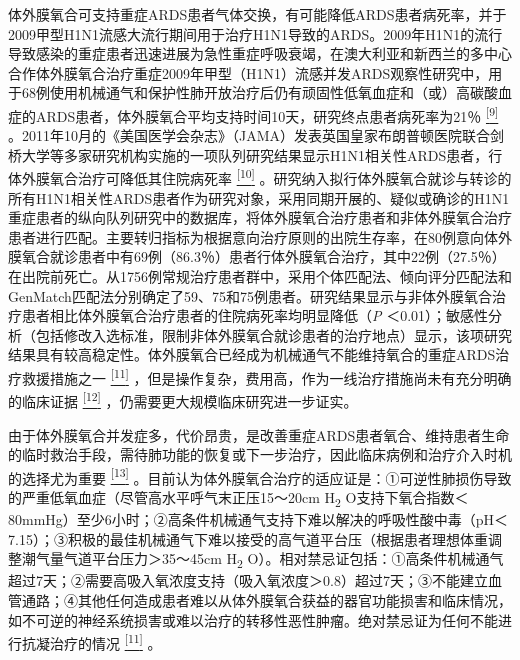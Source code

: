 体外膜氧合可支持重症ARDS患者气体交换，有可能降低ARDS患者病死率，并于2009甲型H1N1流感大流行期间用于治疗H1N1导致的ARDS。2009年H1N1的流行导致感染的重症患者迅速进展为急性重症呼吸衰竭，在澳大利亚和新西兰的多中心合作体外膜氧合治疗重症2009年甲型（H1N1）流感并发ARDS观察性研究中，用于68例使用机械通气和保护性肺开放治疗后仍有顽固性低氧血症和（或）高碳酸血症的ARDS患者，体外膜氧合平均支持时间10天，研究终点患者病死率为21％
\protect\hyperlink{text00030.htmlux5cux23ch9-29}{\textsuperscript{{[}9{]}}}
。2011年10月的《美国医学会杂志》（JAMA）发表英国皇家布朗普顿医院联合剑桥大学等多家研究机构实施的一项队列研究结果显示H1N1相关性ARDS患者，行体外膜氧合治疗可降低其住院病死率
\protect\hyperlink{text00030.htmlux5cux23ch10-29}{\textsuperscript{{[}10{]}}}
。研究纳入拟行体外膜氧合就诊与转诊的所有H1N1相关性ARDS患者作为研究对象，采用同期开展的、疑似或确诊的H1N1重症患者的纵向队列研究中的数据库，将体外膜氧合治疗患者和非体外膜氧合治疗患者进行匹配。主要转归指标为根据意向治疗原则的出院生存率，在80例意向体外膜氧合就诊患者中有69例（86.3％）患者行体外膜氧合治疗，其中22例（27.5％）在出院前死亡。从1756例常规治疗患者群中，采用个体匹配法、倾向评分匹配法和GenMatch匹配法分别确定了59、75和75例患者。研究结果显示与非体外膜氧合治疗患者相比体外膜氧合治疗患者的住院病死率均明显降低（\emph{P}
＜0.01）；敏感性分析（包括修改入选标准，限制非体外膜氧合就诊患者的治疗地点）显示，该项研究结果具有较高稳定性。体外膜氧合已经成为机械通气不能维持氧合的重症ARDS治疗救援措施之一
\protect\hyperlink{text00030.htmlux5cux23ch11-29}{\textsuperscript{{[}11{]}}}
，但是操作复杂，费用高，作为一线治疗措施尚未有充分明确的临床证据
\protect\hyperlink{text00030.htmlux5cux23ch12-29}{\textsuperscript{{[}12{]}}}
，仍需要更大规模临床研究进一步证实。

由于体外膜氧合并发症多，代价昂贵，是改善重症ARDS患者氧合、维持患者生命的临时救治手段，需待肺功能的恢复或下一步治疗，因此临床病例和治疗介入时机的选择尤为重要
\protect\hyperlink{text00030.htmlux5cux23ch13-29}{\textsuperscript{{[}13{]}}}
。目前认为体外膜氧合治疗的适应证是：①可逆性肺损伤导致的严重低氧血症（尽管高水平呼气末正压15～20cm
H\textsubscript{2}
O支持下氧合指数＜80mmHg）至少6小时；②高条件机械通气支持下难以解决的呼吸性酸中毒（pH＜7.15）；③积极的最佳机械通气下难以接受的高气道平台压（根据患者理想体重调整潮气量气道平台压力＞35～45cm
H\textsubscript{2}
O）。相对禁忌证包括：①高条件机械通气超过7天；②需要高吸入氧浓度支持（吸入氧浓度＞0.8）超过7天；③不能建立血管通路；④其他任何造成患者难以从体外膜氧合获益的器官功能损害和临床情况，如不可逆的神经系统损害或难以治疗的转移性恶性肿瘤。绝对禁忌证为任何不能进行抗凝治疗的情况
\protect\hyperlink{text00030.htmlux5cux23ch11-29}{\textsuperscript{{[}11{]}}}
。

